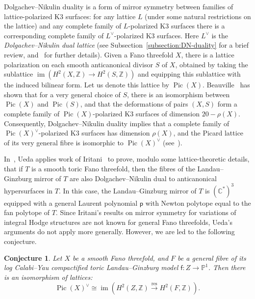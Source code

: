 \documentclass[10pt]{amsart}
\numberwithin{equation}{section}
\theoremstyle{plain}
\newtheorem{conjecture}[theorem]{Conjecture}
\theoremstyle{definition}
\theoremstyle{remark}
\DeclareMathOperator{\im}{im}
\DeclareMathOperator{\Pic}{Pic}
\DeclareMathOperator{\res}{res}
\begin{document}
Dolgachev--Nikulin duality is a form of mirror symmetry between families of lattice-polarized K3 surfaces: for any lattice \(L\) (under some natural restrictions on the lattice) and any complete family of \(L\)-polarized K3 surfaces there is a corresponding complete family of \(L^{\vee}\)-polarized K3 surfaces. Here \(L^{\vee}\) is the \emph{Dolgachev--Nikulin dual lattice} (see Subsection~\ref{subsection:DN-duality} for a brief review, and~\cite{dolgachev1996mirror} for further details). Given a Fano threefold \(X\), there is a lattice polarization on each smooth anticanonical divisor \(S\) of \(X\), obtained by taking the sublattice \(\im (H^2(X,\mathbb{Z})\rightarrow H^2(S,\mathbb{Z}))\) and equipping this sublattice with the induced bilinear form. Let us denote this lattice by \(\Pic(X)\). Beauville~\cite{beauvillefano} has shown that for a very general choice of \(S\), there is an isomorphism between \(\Pic(X)\) and \(\Pic(S)\), and that the deformations of pairs \((X, S)\) form a complete family of \(\Pic(X)\)-polarized K3 surfaces of dimension \(20 - \rho(X)\). Consequently, Dolgachev--Nikulin duality implies that a complete family of \(\Pic(X)^{\vee}\)-polarized K3 surfaces has dimension \(\rho(X)\), and the Picard lattice of its very general fibre is isomorphic to \(\Pic(X)^{\vee}\) (see~\cite[MS2\('\)]{dolgachev1996mirror}).

In~\cite{ueda2020mirror}, Ueda applies work of Iritani~\cite{iritani2009integral} to prove, modulo some lattice-theoretic details, that if \(T\) is a smooth toric Fano threefold, then the fibres of the Landau--Ginzburg mirror of \(T\) are also Dolgachev--Nikulin dual to anticanonical hypersurfaces in \(T\). In this case, the Landau--Ginzburg mirror of \(T\) is \((\mathbb{C}^*)^3\) equipped with a general Laurent polynomial \(\mathsf{p}\) with Newton polytope equal to the fan polytope of \(T\). Since Iritani's results on mirror symmetry for variations of integral Hodge structures are not known for general Fano threefolds, Ueda's arguments do not apply more generally. However, we are led to the following conjecture.

\begin{conjecture}\label{conjecture:DN-duality}
  Let \(X\) be a smooth Fano threefold, and \(F\) be a general fibre of its log Calabi--Yau compactified toric Landau--Ginzburg model \(\mathsf{f} \colon Z \rightarrow \mathbb{P}^1\). Then there is an isomorphism of lattices:
  \[
    \Pic(X)^{\vee} \cong \im \left ( H^2(Z, \mathbb{Z}) \xrightarrow{\res} H^2(F, \mathbb{Z}) \right ).
  \]
\end{conjecture}
\end{document}
